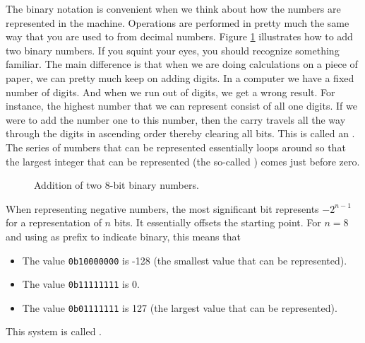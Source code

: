 
The binary notation is convenient when we think about how the numbers are represented in the machine. Operations are performed in pretty much the same way that you are used to from decimal numbers. Figure \ref{fig:prim:int:binary:add} illustrates how to add two binary numbers. If you squint your eyes, you should recognize something familiar. The main difference is that when we are doing calculations on a piece of paper, we can pretty much keep on adding digits. In a computer we have a fixed number of digits. And when we run out of digits, we get a wrong result. For instance, the highest number that we can represent consist of all one digits. If we were to add the number one to this number, then the carry travels all the way through the digits in ascending order thereby clearing all bits. This is called an . The series of numbers that can be represented essentially loops around so that the largest integer that can be represented (the so-called ) comes just before zero.

\begin{figure}[tbp]
  
  \caption{Addition of two 8-bit binary numbers.}
  \label{fig:prim:int:binary:add}
\end{figure}

When representing negative numbers, the most significant bit represents $-2^{n-1}$ for a representation of $n$ bits. It essentially offsets the starting point. For $n=8$ and using  as prefix to indicate binary, this means that
\begin{itemize}
  \item The value \texttt{0b10000000} is -128 (the smallest value that can be represented).
  \item The value \texttt{0b11111111} is 0.
  \item The value \texttt{0b01111111} is 127 (the largest value that can be represented).
\end{itemize}

This system is called .

\subsection{\csharp}

